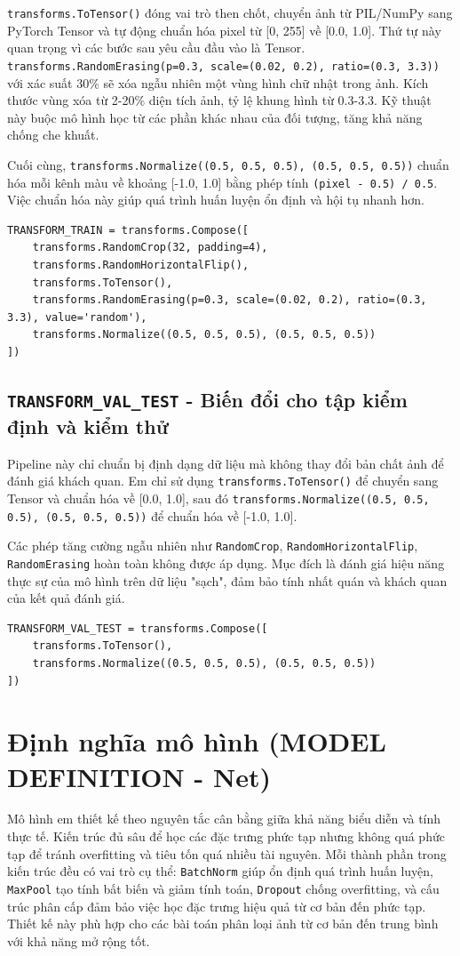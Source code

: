 \documentclass[12pt, a4paper, openany]{report}
\begin{document}
\texttt{transforms.ToTensor()} đóng vai trò then chốt, chuyển ảnh từ PIL/NumPy sang PyTorch Tensor và tự động chuẩn hóa pixel từ [0, 255] về [0.0, 1.0]. Thứ tự này quan trọng vì các bước sau yêu cầu đầu vào là Tensor. \texttt{transforms.RandomErasing(p=0.3, scale=(0.02, 0.2), ratio=(0.3, 3.3))} với xác suất 30\% sẽ xóa ngẫu nhiên một vùng hình chữ nhật trong ảnh. Kích thước vùng xóa từ 2-20\% diện tích ảnh, tỷ lệ khung hình từ 0.3-3.3. Kỹ thuật này buộc mô hình học từ các phần khác nhau của đối tượng, tăng khả năng chống che khuất. 

Cuối cùng, \texttt{transforms.Normalize((0.5, 0.5, 0.5), (0.5, 0.5, 0.5))} chuẩn hóa mỗi kênh màu về khoảng [-1.0, 1.0] bằng phép tính \texttt{(pixel - 0.5) / 0.5}. Việc chuẩn hóa này giúp quá trình huấn luyện ổn định và hội tụ nhanh hơn.

\begin{verbatim}
TRANSFORM_TRAIN = transforms.Compose([
    transforms.RandomCrop(32, padding=4),
    transforms.RandomHorizontalFlip(),
    transforms.ToTensor(),
    transforms.RandomErasing(p=0.3, scale=(0.02, 0.2), ratio=(0.3, 3.3), value='random'),
    transforms.Normalize((0.5, 0.5, 0.5), (0.5, 0.5, 0.5))
])
\end{verbatim}

\subsection{\texttt{TRANSFORM\_VAL\_TEST} - Biến đổi cho tập kiểm định và kiểm thử}
Pipeline này chỉ chuẩn bị định dạng dữ liệu mà không thay đổi bản chất ảnh để đánh giá khách quan. Em chỉ sử dụng \texttt{transforms.ToTensor()} để chuyển sang Tensor và chuẩn hóa về [0.0, 1.0], sau đó \texttt{transforms.Normalize((0.5, 0.5, 0.5), (0.5, 0.5, 0.5))} để chuẩn hóa về [-1.0, 1.0]. 

Các phép tăng cường ngẫu nhiên như \texttt{RandomCrop}, \texttt{RandomHorizontalFlip}, \texttt{RandomErasing} hoàn toàn không được áp dụng. Mục đích là đánh giá hiệu năng thực sự của mô hình trên dữ liệu "sạch", đảm bảo tính nhất quán và khách quan của kết quả đánh giá.

\begin{verbatim}
TRANSFORM_VAL_TEST = transforms.Compose([
    transforms.ToTensor(),
    transforms.Normalize((0.5, 0.5, 0.5), (0.5, 0.5, 0.5))
])
\end{verbatim}

\section{Định nghĩa mô hình (MODEL DEFINITION - Net)}
Mô hình em thiết kế theo nguyên tắc cân bằng giữa khả năng biểu diễn và tính thực tế. Kiến trúc đủ sâu để học các đặc trưng phức tạp nhưng không quá phức tạp để tránh overfitting và tiêu tốn quá nhiều tài nguyên. Mỗi thành phần trong kiến trúc đều có vai trò cụ thể: \texttt{BatchNorm} giúp ổn định quá trình huấn luyện, \texttt{MaxPool} tạo tính bất biến và giảm tính toán, \texttt{Dropout} chống overfitting, và cấu trúc phân cấp đảm bảo việc học đặc trưng hiệu quả từ cơ bản đến phức tạp. Thiết kế này phù hợp cho các bài toán phân loại ảnh từ cơ bản đến trung bình với khả năng mở rộng tốt.
\end{document}
